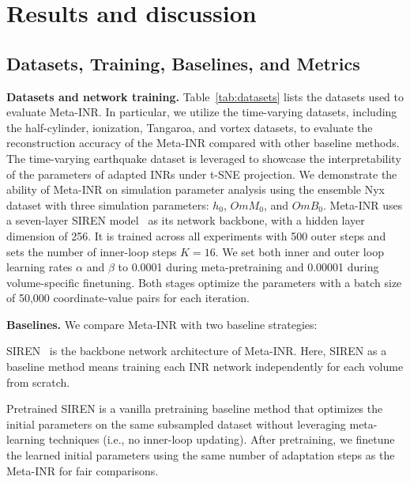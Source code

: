 \vspace{-0.1in}
\section{Results and discussion}

\subsection{Datasets, Training, Baselines, and Metrics}

{\bf Datasets and network training.}
Table~\ref{tab:datasets} lists the datasets used to evaluate Meta-INR. 
In particular, we utilize the time-varying datasets, including the half-cylinder, ionization, Tangaroa, and vortex datasets, to evaluate the reconstruction accuracy of the Meta-INR compared with other baseline methods.
The time-varying earthquake dataset is leveraged to showcase the interpretability of the parameters of adapted INRs under t-SNE projection.
We demonstrate the ability of Meta-INR on simulation parameter analysis using the ensemble Nyx dataset with three simulation parameters: $h_0$, $OmM_0$, and $OmB_0$.
Meta-INR uses a seven-layer SIREN model~\cite{Sitzmann-SIREN-NeurIPS20} as its network backbone, with a hidden layer dimension of 256.
It is trained across all experiments with 500 outer steps and sets the number of inner-loop steps $K=16$.
We set both inner and outer loop learning rates $\alpha$ and $\beta$ to 0.0001 during meta-pretraining and 0.00001 during volume-specific finetuning. 
Both stages optimize the parameters with a batch size of 50,000 coordinate-value pairs for each iteration.

{\bf Baselines.} We compare Meta-INR with two baseline strategies:
\begin{myitemize}
\vspace{-0.05in}
    \item SIREN~\cite{Sitzmann-SIREN-NeurIPS20} is the backbone network architecture of Meta-INR. Here, SIREN as a baseline method means training each INR network independently for each volume from scratch.
    \item Pretrained SIREN is a vanilla pretraining baseline method that optimizes the initial parameters on the same subsampled dataset without leveraging meta-learning techniques (i.e., no inner-loop updating). After pretraining, we finetune the learned initial parameters using the same number of adaptation steps as the Meta-INR for fair comparisons.

\vspace{-0.05in}
\end{myitemize}


